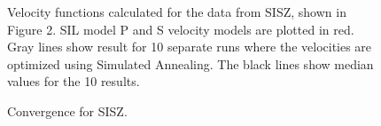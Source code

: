\documentclass[extra]{gji}
\begin{document}
\begin{figure}
	\caption{
		Velocity functions calculated for the data from SISZ, 
		shown in Figure 2. SIL model P and S velocity models are
		plotted in red. Gray lines show result for 10 separate runs where
		the velocities are optimized using Simulated Annealing. The black 
		lines show median values for the 10 results.
		}
\end{figure}

\begin{figure}
	\caption{
		Convergence for SISZ.
		}
\end{figure}
\end{document}
